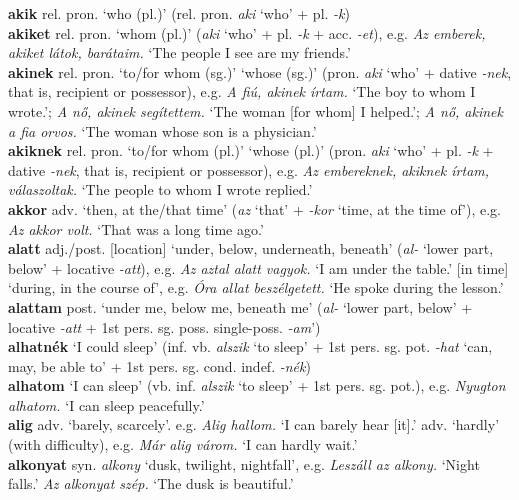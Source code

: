 \documentclass[11pt]{article}
\begin{document}
\textbf{akik} rel. pron. `who (pl.)' (rel. pron. \emph{aki} `who' +
pl. \emph{-k}) \\
\textbf{akiket} rel. pron. `whom (pl.)' (\emph{aki} `who' + pl. \emph{-k} +
acc. \emph{-et}), e.g. \emph{Az emberek, akiket látok, barátaim.} `The people I
see are my friends.' \\
\textbf{akinek} rel. pron. `to/for whom (sg.)' \textbar\textbar{} `whose (sg.)'
(pron. \emph{aki} `who' + dative \emph{-nek}, that is, recipient or possessor),
e.g. \emph{A fiú, akinek írtam.} `The boy to whom I wrote.'; \emph{A nő, akinek
segítettem.} `The woman [for whom] I helped.'; \emph{A nő, akinek a fia orvos.}
`The woman whose son is a physician.' \\
\textbf{akiknek} rel. pron. `to/for whom (pl.)' \textbar\textbar{} `whose (pl.)'
(pron. \emph{aki} `who' + pl. \emph{-k} + dative \emph{-nek}, that is, recipient
or possessor), e.g. \emph{Az embereknek, akiknek írtam, válaszoltak.} `The
people to whom I wrote replied.' \\
\textbf{akkor} adv. `then, at the/that time' (\emph{az} `that' + \emph{-kor}
`time, at the time of'), e.g. \emph{Az akkor volt.} `That was a long time ago.'\\
\textbf{alatt} adj./post. [location] `under, below, underneath, beneath'
(\emph{al-} `lower part, below' + locative \emph{-att}), e.g. \emph{Az aztal alatt
vagyok.} `I am under the table.' \textbar\textbar{} [in time] `during, in the
course of', e.g. \emph{Óra allat beszélgetett.} `He spoke during the lesson.'\\
\textbf{alattam} post. `under me, below me, beneath me' (\emph{al-} `lower
part, below' + locative \emph{-att} + 1st
pers. sg. poss. single\hyp{}poss. \emph{-am}') \\
\textbf{alhatnék} `I could sleep' (inf. vb. \emph{alszik}
`to sleep' + 1st pers. sg. pot. \emph{-hat} `can, may, be able to' +
1st pers. sg. cond. indef. \emph{-nék}) \\
\textbf{alhatom} `I can sleep' (vb. inf. \emph{alszik} `to sleep' + 1st
pers. sg. pot.), e.g. \emph{Nyugton alhatom.} `I can sleep peacefully.'\\
\textbf{alig} adv. `barely, scarcely'. e.g. \emph{Alig hallom.} `I can barely
hear [it].' \textbar\textbar{} adv. `hardly' (with difficulty), e.g. \emph{Már
alig várom.} `I can hardly wait.' \\
\textbf{alkonyat} syn. \emph{alkony} `dusk, twilight, nightfall',
e.g. \emph{Leszáll az alkony.} `Night falls.' \emph{Az alkonyat szép.} `The
dusk is beautiful.'\\
\end{document}

